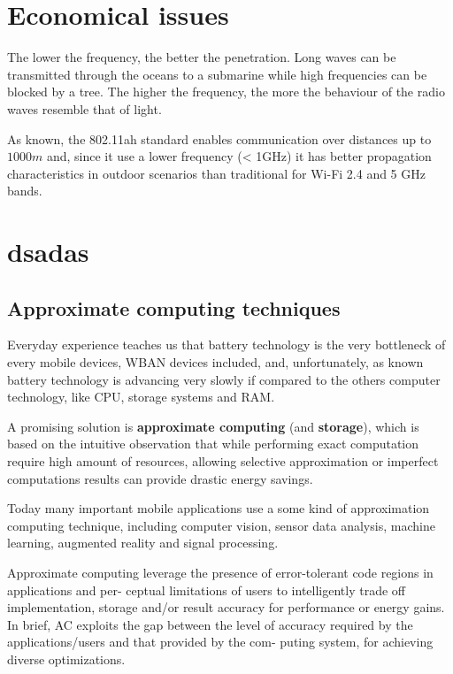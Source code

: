 \documentclass[sigchi]{acmart}
\begin{document}
\section{Economical issues}

The lower the frequency, the better the penetration. Long waves can be transmitted through the oceans to a submarine while high frequencies can be blocked by a tree. The higher the frequency, the more the behaviour of the radio waves resemble that of light.

As known, the 802.11ah standard enables communication over distances up to $1000 m$ and, since it use a lower frequency (< 1GHz) it has better propagation characteristics in outdoor scenarios than traditional for Wi-Fi 2.4 and 5 GHz bands. 



\section{dsadas}




\subsection{Approximate computing techniques}

Everyday experience teaches us that battery technology is the very bottleneck of every mobile devices, WBAN devices included, and, unfortunately, as known battery technology is advancing very slowly if compared to the others computer technology, like CPU, storage systems and RAM.

A promising solution is \textbf{approximate computing} (and \textbf{storage}), which is based on the intuitive observation that while performing exact computation require high amount of resources, allowing selective approximation or imperfect computations results can provide drastic energy savings.

Today many important mobile applications use a some kind of approximation computing technique, including computer vision, sensor data analysis, machine learning, augmented reality and signal processing. 

Approximate computing leverage the presence of error-tolerant code regions in applications and per-
ceptual limitations of users to intelligently trade off implementation, storage and/or
result accuracy for performance or energy gains. In brief, AC exploits the gap between
the level of accuracy required by the applications/users and that provided by the com-
puting system, for achieving diverse optimizations.
\end{document}
